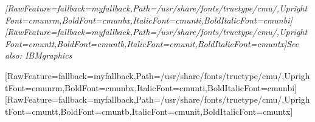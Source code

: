 \begin{myquote}
\item{}{\itshape \allowbreak{}\setmainfont{cmunti.ttf}[RawFeature={fallback=myfallback},Path=/usr/share/fonts/truetype/cmu/,UprightFont=cmunrm,BoldFont=cmunbx,ItalicFont=cmunti,BoldItalicFont=cmunbi]\setmonofont{cmunti.ttf}[RawFeature={fallback=myfallback},Path=/usr/share/fonts/truetype/cmu/,UprightFont=cmuntt,BoldFont=cmuntb,ItalicFont=cmunit,BoldItalicFont=cmuntx]\itshape See also: IBMgraphics\footnotemark[34]}
\end{myquote}
\allowbreak{}\setmainfont{cmunrm.ttf}[RawFeature={fallback=myfallback},Path=/usr/share/fonts/truetype/cmu/,UprightFont=cmunrm,BoldFont=cmunbx,ItalicFont=cmunti,BoldItalicFont=cmunbi]\setmonofont{cmunrm.ttf}[RawFeature={fallback=myfallback},Path=/usr/share/fonts/truetype/cmu/,UprightFont=cmuntt,BoldFont=cmuntb,ItalicFont=cmunit,BoldItalicFont=cmuntx]
